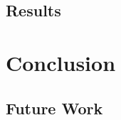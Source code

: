 \documentclass[11pt]{report}
\begin{document}
	
	\section{Results}
	



\chapter{Conclusion}

	\section{Future Work} 

\newpage
	
{}

	
\end{document}
